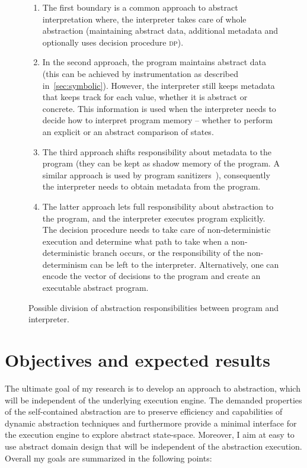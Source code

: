 \begin{figure}[h]
{
}

\bigskip
\prule

\begin{enumerate}
    \item The first boundary is a common approach to abstract
        interpretation where, the interpreter takes care of whole abstraction
        (maintaining abstract data, additional metadata and optionally uses
        decision procedure \textsc{dp}).
    \item In the second approach, the program maintains abstract
        data (this can be achieved by instrumentation as described
        in~\autoref{sec:symbolic}).  However, the interpreter still keeps metadata
        that keeps track for each value, whether it is abstract or concrete.
        This information is used when the interpreter needs to decide how to
        interpret program memory -- whether to perform an explicit or an abstract
        comparison of states.
    \item The third approach shifts responsibility about metadata to
        the program (they can be kept as shadow memory of the program. A
        similar approach is used by program sanitizers~\cite{Stepanov2015}),
        consequently the interpreter needs to obtain metadata from the program.
    \item The latter approach lets full responsibility about abstraction to the
        program, and the interpreter executes program explicitly. The decision
        procedure needs to take care of non-deterministic execution and
        determine what path to take when a non-deterministic branch occurs, or
        the responsibility of the non-determinism can be left to the
        interpreter. Alternatively, one can encode the vector of decisions to
        the program and create an executable abstract program.
\end{enumerate}

\caption{Possible division of abstraction responsibilities between program and interpreter.}
\label{fig:bounds}

\end{figure}

\section{Objectives and expected results}
\label{sec:objectives}

The ultimate goal of my research is to develop an approach to abstraction,
which will be independent of the underlying execution engine. The demanded
properties of the self-contained abstraction are to preserve efficiency and
capabilities of dynamic abstraction techniques and furthermore provide a
minimal interface for the execution engine to explore abstract state-space.
Moreover, I aim at easy to use abstract domain design that will be independent
of the abstraction execution. Overall my goals are summarized in the following
points:


